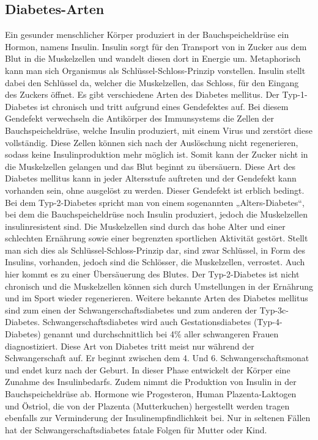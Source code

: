 \documentclass[a4paper,11pt]{article}%
\renewcommand{\\}{\vspace*{0.5\baselineskip} \newline}
\begin{document}
	\subsection{Diabetes-Arten}
	Ein gesunder menschlicher Körper produziert in der Bauchspeicheldrüse ein Hormon, namens Insulin. Insulin sorgt für den Transport von in Zucker aus dem Blut in die Muskelzellen und wandelt diesen dort in Energie um. Metaphorisch kann man sich Organismus als Schlüssel-Schloss-Prinzip vorstellen. Insulin stellt dabei den Schlüssel da, welcher die Muskelzellen, das Schloss, für den Eingang des Zuckers öffnet. Es gibt verschiedene Arten des Diabetes mellitus. \\	
	Der Typ-1-Diabetes ist chronisch und tritt aufgrund eines Gendefektes auf. Bei diesem Gendefekt verwechseln die Antikörper des Immunsystems die Zellen der Bauchspeicheldrüse, welche Insulin produziert, mit einem Virus und zerstört diese vollständig. Diese Zellen können sich nach der Auslöschung nicht regenerieren, sodass keine Insulinproduktion mehr möglich ist. Somit kann der Zucker nicht in die Muskelzellen gelangen und das Blut beginnt zu übersäuern. Diese Art des Diabetes mellitus kann in jeder Altersstufe auftreten und der Gendefekt kann vorhanden sein, ohne ausgelöst zu werden. Dieser Gendefekt ist erblich bedingt.\\
	Bei dem Typ-2-Diabetes spricht man von einem sogenannten „Alters-Diabetes“, bei dem die Bauchspeicheldrüse noch Insulin produziert, jedoch die Muskelzellen insulinresistent sind. Die Muskelzellen sind durch das hohe Alter und einer schlechten Ernährung sowie einer begrenzten sportlichen Aktivität gestört. Stellt man sich dies als Schlüssel-Schloss-Prinzip dar, sind zwar Schlüssel, in Form des Insulins, vorhanden, jedoch sind die Schlösser, die Muskelzellen, verrostet. Auch hier kommt es zu einer Übersäuerung des Blutes. Der Typ-2-Diabetes ist nicht chronisch und die Muskelzellen können sich durch Umstellungen in der Ernährung und im Sport wieder regenerieren.\\
	Weitere bekannte Arten des Diabetes mellitus sind zum einen der Schwangerschaftsdiabetes und zum anderen der Typ-3c-Diabetes.\newline
	Schwangerschaftsdiabetes wird auch Gestationsdiabetes (Typ-4-Diabetes) genannt und durchschnittlich bei 4\% aller schwangeren Frauen diagnostiziert. Diese Art von Diabetes tritt meist nur während der Schwangerschaft auf. Er beginnt zwischen dem 4. Und 6. Schwangerschaftsmonat und endet kurz nach der Geburt. In dieser Phase entwickelt der Körper eine Zunahme des Insulinbedarfs. Zudem nimmt die Produktion von Insulin in der Bauchspeicheldrüse ab. Hormone wie Progesteron, Human Plazenta-Laktogen und Östriol, die von der Plazenta (Mutterkuchen) hergestellt werden tragen ebenfalls zur Verminderung der Insulinempfindlichkeit bei. Nur in seltenen Fällen hat der Schwangerschaftsdiabetes fatale Folgen für Mutter oder Kind.\\
\end{document}
